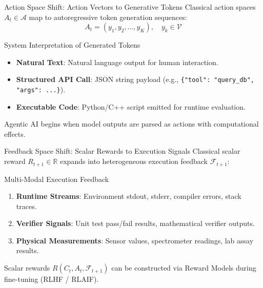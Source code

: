 \documentclass[10pt, aspectratio=169]{beamer}
\begin{document}
\begin{frame}{Action Space Shift: Action Vectors to Generative Tokens}
  Classical action spaces $A_t \in \mathcal{A}$ map to autoregressive token generation sequences:
  $$A_t = (y_1, y_2, \dots, y_K), \quad y_k \in \mathcal{V}$$

  \begin{block}{System Interpretation of Generated Tokens}
    \begin{itemize}
      \item \textbf{Natural Text}: Natural language output for human interaction.
      \item \textbf{Structured API Call}: JSON string payload (e.g., \texttt{\{"tool": "query\_db", "args": ...\}}).
      \item \textbf{Executable Code}: Python/C++ script emitted for runtime evaluation.
    \end{itemize}
  \end{block}
  Agentic AI begins when model outputs are parsed as actions with computational effects.
\end{frame}

\begin{frame}{Feedback Space Shift: Scalar Rewards to Execution Signals}
  Classical scalar reward $R_{t+1} \in \mathbb{R}$ expands into heterogeneous execution feedback $\mathcal{F}_{t+1}$:

  \begin{block}{Multi-Modal Execution Feedback}
    \begin{enumerate}
      \item \textbf{Runtime Streams}: Environment stdout, stderr, compiler errors, stack traces.
      \item \textbf{Verifier Signals}: Unit test pass/fail results, mathematical verifier outputs.
      \item \textbf{Physical Measurements}: Sensor values, spectrometer readings, lab assay results.
    \end{enumerate}
  \end{block}
  Scalar rewards $R(C_t, A_t, \mathcal{F}_{t+1})$ can be constructed via Reward Models during fine-tuning (RLHF / RLAIF).
\end{frame}
\end{document}

